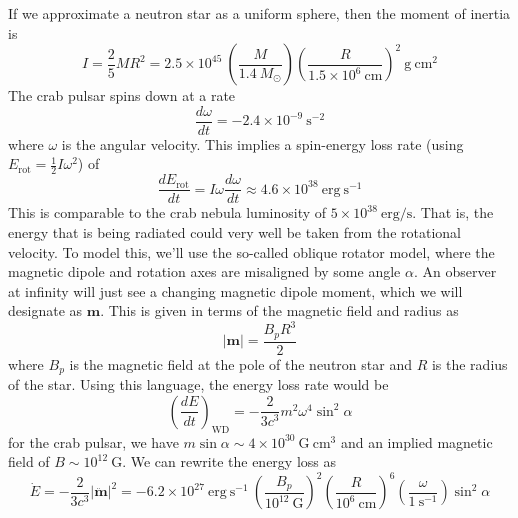 \documentclass[10pt]{article}
\numberwithin{equation}{section}
\newcommand{\n}{\noindent}
\newcommand{\norm}[1]{\left\lvert#1\right\rvert}
\begin{document}
	\n If we approximate a neutron star as a uniform sphere, then the moment of inertia is
	\begin{equation}
		\label{eq:spindown:1} I = \frac{2}{5}M R^2 = 2.5\times 10^{45}\ \left(\frac{M}{1.4\ M_\odot}\right) \left(\frac{R}{1.5\times 10^6\ \mathrm{cm}}\right)^{2}\ \mathrm{g\ cm^2}
	\end{equation}
	The crab pulsar spins down at a rate
	\begin{equation}
		\label{eq:spindown:2} \frac{d\omega}{dt} = -2.4\times 10^{-9}\ \mathrm{s^{-2}}
	\end{equation}
	where $\omega$ is the angular velocity. This implies a spin-energy loss rate (using $E_{\mathrm{rot}} = \frac{1}{2} I \omega^2$) of
	\begin{equation}
		\label{eq:spindown:3} \frac{dE_{\mathrm{rot}}}{dt} = I\omega\frac{d\omega}{dt} \approx 4.6\times 10^{38}\ \mathrm{erg\ s^{-1}}
	\end{equation}
	This is comparable to the crab nebula luminosity of $5\times 10^{38}\ \mathrm{erg/s}$. That is, the energy that is being radiated could very well be taken from the rotational velocity. To model this, we'll use the so-called oblique rotator model, where the magnetic dipole and rotation axes are misaligned by some angle $\alpha$. An observer at infinity will just see a changing magnetic dipole moment, which we will designate as $\mathbf{m}$. This is given in terms of the magnetic field and radius as
	\begin{equation}
		\label{eq:spindown:4} \norm{\mathbf{m}} = \frac{B_p R^3}{2}
	\end{equation}
	where $B_p$ is the magnetic field at the pole of the neutron star and $R$ is the radius of the star. Using this language, the energy loss rate would be
	\begin{equation}
		\label{eq:spindown:5} \left(\frac{dE}{dt}\right)_{\mathrm{WD}} = -\frac{2}{3c^3}m^2\omega^4\sin^2\alpha
	\end{equation}
	for the crab pulsar, we have $m\sin\alpha\sim 4\times 10^{30}\ \mathrm{G\ cm^3}$ and an implied magnetic field of $B\sim 10^{12}\ \mathrm{G}$. We can rewrite the energy loss as
	\begin{equation}
		\label{eq:spindown:6} \dot{E} = -\frac{2}{3c^3}\norm{\ddot{\mathbf{m}}}^2 = -6.2\times 10^{27}\ \mathrm{erg\ s^{-1}}\ \left(\frac{B_p}{10^{12}\ \mathrm{G}}\right)^2 \left(\frac{R}{10^6\ \mathrm{cm}}\right)^6 \left(\frac{\omega}{\mathrm{1\ s^{-1}}}\right)\sin^2\alpha
	\end{equation}
\end{document}
